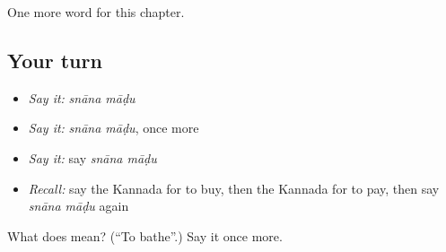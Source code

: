 \begin{grammarlens}[title={What you've built}]
One more word for this chapter.
\end{grammarlens}

\subsection*{Your turn}
\begin{itemize}
\raggedright
  \item \emph{Say it:} \emph{snāna māḍu}
  \item \emph{Say it:} \emph{snāna māḍu}, once more
  \item \emph{Say it:} say \emph{snāna māḍu}
  \item \emph{Recall:} say the Kannada for to buy, then the Kannada for to pay, then say \emph{snāna māḍu} again
\end{itemize}

\begin{tcolorbox}[breakable,colback=teal!4,colframe=teal!35!black,title={Before you move on}]
What does   mean? (\textquotedblleft{}To bathe\textquotedblright{}.) Say it once more.
\end{tcolorbox}
